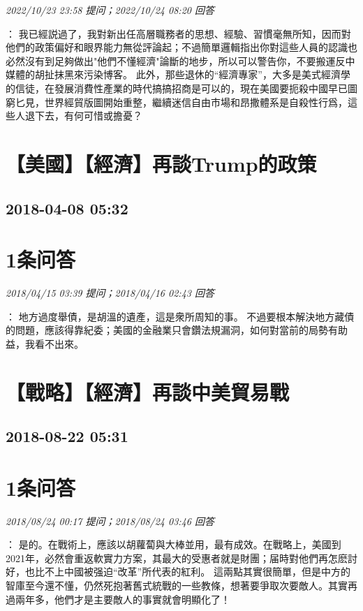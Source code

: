 \documentclass[twocolumn]{ctexart}
\begin{document}
\textit{\hfill\noindent\small 2022/10/23 23:58 提问；2022/10/24 08:20 回答}

：
我已經説過了，我對新出任高層職務者的思想、經驗、習慣毫無所知，因而對他們的政策偏好和眼界能力無從評論起；不過簡單邏輯指出你對這些人員的認識也必然沒有到足夠做出"他們不懂經濟"論斷的地步，所以可以警告你，不要搬運反中媒體的胡扯抹黑來污染博客。
此外，那些退休的“經濟專家”，大多是美式經濟學的信徒，在發展消費性產業的時代搞搞招商是可以的，現在美國要扼殺中國早已圖窮匕見，世界經貿版圖開始重整，繼續迷信自由市場和昂撒體系是自殺性行爲，這些人退下去，有何可惜或擔憂？
\\


\section{【美國】【經濟】再談Trump的政策}
\subsection{2018-04-08 05:32}


\section{1条问答}

\textit{\hfill\noindent\small 2018/04/15 03:39 提问；2018/04/16 02:43 回答}

：
地方過度舉債，是胡溫的遺產，這是衆所周知的事。
不過要根本解決地方藏債的問題，應該得靠紀委；美國的金融業只會鑽法規漏洞，如何對當前的局勢有助益，我看不出來。
\\


\section{【戰略】【經濟】再談中美貿易戰}
\subsection{2018-08-22 05:31}


\section{1条问答}

\textit{\hfill\noindent\small 2018/08/24 00:17 提问；2018/08/24 03:46 回答}

：
是的。在戰術上，應該以胡蘿蔔與大棒並用，最有成效。在戰略上，美國到2021年，必然會重返軟實力方案，其最大的受惠者就是財團；届時對他們再怎麽討好，也比不上中國被强迫“改革”所代表的紅利。
這兩點其實很簡單，但是中方的智庫至今還不懂，仍然死抱著舊式統戰的一些教條，想著要爭取次要敵人。其實再過兩年多，他們才是主要敵人的事實就會明顯化了！
\\
\end{document}
